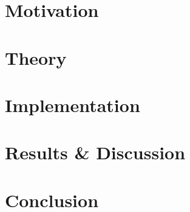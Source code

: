 \documentclass[12pt, twoside,a4paper]{report}
\begin{document}
\tableofcontents
\chapter{Motivation}


\chapter{Theory}


\chapter{Implementation}


\chapter{Results \& Discussion}


\chapter{Conclusion}

 

%

\end{document}

